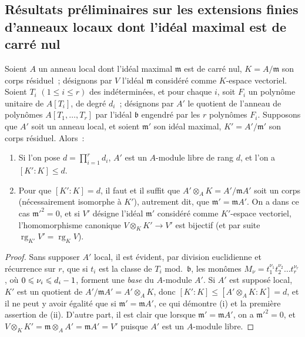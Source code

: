 \subsection{Résultats préliminaires sur les extensions finies d'anneaux locaux dont l'idéal maximal est de carré nul}
\label{subsection:0.22.4-fr}
\label{0.22.4-fr}

\begin{proposition}[22.4.1]
\label{0.22.4.1-fr}
Soient $A$ un anneau local dont l'idéal maximal $\mathfrak m$ est de carré
nul, $K=A/\mathfrak m$ son corps résiduel~; désignons par $V$ l'idéal
$\mathfrak m$ considéré comme $K$-espace vectoriel. Soient $T_i$
$(1\leqslant i\leqslant r)$ des indéterminées, et pour chaque $i$, soit
$F_i$ un polynôme unitaire de $A[T_i]$, de degré $d_i$~; désignons par $A'$ le
quotient de l'anneau de polynômes $A[T_1,\ldots,T_r]$ par l'idéal
$\mathfrak b$ engendré par les $r$ polynômes $F_i$. Supposons que $A'$ soit
un anneau local, et soient $\mathfrak m'$ son idéal maximal,
$K'=A'/\mathfrak m'$ son corps résiduel. Alors~:
\begin{enumerate}
  \item[\textup{(i)}] Si l'on pose $d=\prod_{i=1}^r d_i$, $A'$ est un $A$-module
  libre de rang $d$, et l'on a $[K':K]\leqslant d$.
  \item[\textup{(ii)}] Pour que $[K':K]=d$, il faut et il suffit que
  $A'\otimes_AK=A'/\mathfrak mA'$ soit un corps (nécessairement isomorphe à
  $K'$), autrement dit, que $\mathfrak m'=\mathfrak mA'$. On a dans ce cas
  $\mathfrak m'^2=0$, et si $V'$ désigne l'idéal $\mathfrak m'$ considéré
  comme $K'$-espace vectoriel, l'homomorphisme canonique
  $V\otimes_KK'\to V'$ est bijectif (et par suite
  $\operatorname{rg}_{K'}V'=\operatorname{rg}_K V$).
\end{enumerate}
\end{proposition}

\begin{proof}
Sans supposer $A'$ local, il est évident, par division euclidienne et
récurrence sur $r$, que si $t_i$ est la classe de $T_i$ mod.~$\mathfrak b$,
les monômes
$M_\nu=t_1^{\nu_1}t_2^{\nu_2}\ldots t_r^{\nu_r}$, où
$0\leqslant\nu_i\leqslant d_i- 1$, forment une \emph{base} du $A$-module $A'$. Si
$A'$ est supposé local, $K'$ est un quotient de
$A'/\mathfrak mA'=A'\otimes_AK$, donc
$[K':K]\leqslant[A'\otimes_AK:K]=d$, et il ne peut y avoir égalité que si
$\mathfrak m'=\mathfrak mA'$, ce qui démontre (i) et la première assertion
de (ii). D'autre part, il est clair que lorsque
$\mathfrak m'=\mathfrak mA'$, on a $\mathfrak m'^2=0$, et
$V\otimes_KK'=\mathfrak m\otimes_AA'=\mathfrak mA'=V'$ puisque $A'$ est
un $A$-module libre.
\end{proof}

